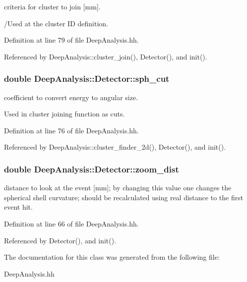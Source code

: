 criteria for cluster to join [mm]. 

/\-Used at the cluster I\-D definition. 

Definition at line 79 of file Deep\-Analysis.\-hh.



Referenced by Deep\-Analysis\-::cluster\-\_\-join(), Detector(), and init().

\subsubsection[{sph\-\_\-cut}]{\setlength{\rightskip}{0pt plus 5cm}double Deep\-Analysis\-::\-Detector\-::sph\-\_\-cut}\label{classDeepAnalysis_1_1Detector_a0c215c59b599b6a585056c880278b860}


coefficient to convert energy to angular size. 

Used in cluster joining function as cuts. 

Definition at line 76 of file Deep\-Analysis.\-hh.



Referenced by Deep\-Analysis\-::cluster\-\_\-finder\-\_\-2d(), Detector(), and init().

\subsubsection[{zoom\-\_\-dist}]{\setlength{\rightskip}{0pt plus 5cm}double Deep\-Analysis\-::\-Detector\-::zoom\-\_\-dist}\label{classDeepAnalysis_1_1Detector_a33227b51d64d96fdaba6c0c52e6caa5e}


distance to look at the event [mm]; by changing this value one changes the spherical shell curvature; should be recalculated using real distance to the first event hit. 



Definition at line 66 of file Deep\-Analysis.\-hh.



Referenced by Detector(), and init().



The documentation for this class was generated from the following file\-:\begin{DoxyCompactItemize}
\item 
Deep\-Analysis.\-hh\end{DoxyCompactItemize}
